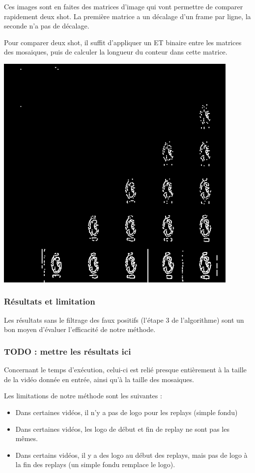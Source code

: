 \documentclass[11pt]{article}
\begin{document}
Ces images sont en faites des matrices d'image qui vont permettre de comparer rapidement deux shot.
La première matrice a un décalage d'un frame par ligne, la seconde n'a pas de décalage.

Pour comparer deux shot, il suffit d’appliquer un ET binaire entre les matrices des mosaiques, puis de calculer la longueur du conteur dans cette matrice.
\begin{center}
\includegraphics[width=.9\linewidth]{mosaique3.png}
\end{center}

\subsubsection{Résultats et limitation}
\label{sec:org8fd05b6}
Les résultats sans le filtrage des faux positifs (l’étape 3 de l’algorithme) sont un bon moyen d’évaluer l’efficacité de notre méthode.
\subsubsection{{\bfseries\sffamily TODO} : mettre les résultats ici}
\label{sec:org2e64dfe}
Concernant le temps d’exécution, celui-ci est relié presque entièrement à la taille de la vidéo donnée en entrée, ainsi qu’à la taille des mosaiques.

Les limitations de notre méthode sont les suivantes :
\begin{itemize}
\item Dans certaines vidéos, il n’y a pas de logo pour les replays (simple fondu)
\item Dans certaines vidéos, les logo de début et fin de replay ne sont pas les mêmes.
\item Dans certains vidéos, il y a des logo au début des replays, mais pas de logo à la fin des replays (un simple fondu remplace le logo).
\end{itemize}
\end{document}
